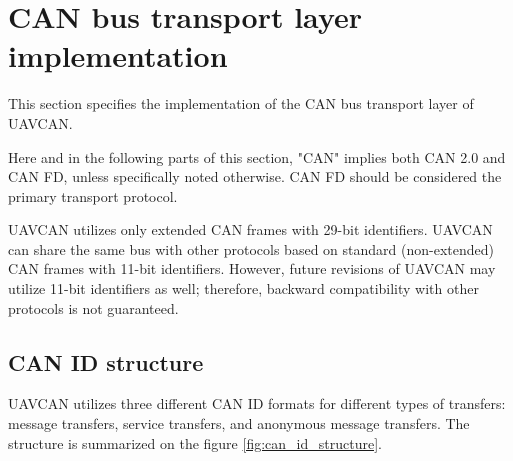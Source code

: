 \section{CAN bus transport layer implementation}

This section specifies the implementation of the CAN bus transport layer of UAVCAN.

Here and in the following parts of this section,
"CAN" implies both CAN 2.0 and CAN FD, unless specifically noted otherwise.
CAN FD should be considered the primary transport protocol.

UAVCAN utilizes only extended CAN frames with 29-bit identifiers.
UAVCAN can share the same bus with other protocols based on standard (non-extended) CAN frames with 11-bit identifiers.
However, future revisions of UAVCAN may utilize 11-bit identifiers as well;
therefore, backward compatibility with other protocols is not guaranteed.

\subsection{CAN ID structure}

UAVCAN utilizes three different CAN ID formats for different types of transfers:
message transfers, service transfers, and anonymous message transfers.
The structure is summarized on the figure \ref{fig:can_id_structure}.

